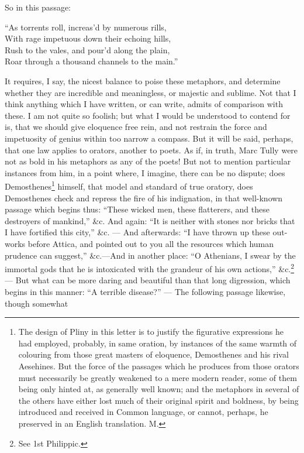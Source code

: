 So in this passage:

``As torrents roll, increas'd by numerous rills,\\
With rage impetuous down their echoing hills,\\
Rush to the vales, and pour'd along the plain,\\
Roar through a thousand channels to the main.''

It requires, I say, the nicest balance to poise these metaphors, and
determine whether they are incredible and meaningless, or majestic and
sublime. Not that I think anything which I have written, or can write,
admits of comparison with these. I am not quite so foolish; but what I
would be understood to contend for is, that we should give eloquence free
rein, and not restrain the force and impetuosity of genius within too
narrow a compass. But it will be said, perhaps, that one law applies to
orators, another to poets. As if, in truth, Marc Tully were not as bold in
his metaphors as any of the poets! But not to mention particular instances
from him, in a point where, I imagine, there can be no dispute; does
Demosthenes\footnote{The design of Pliny in
this letter is to justify the figurative expressions he had employed,
probably, in same oration, by instances of the same warmth of colouring
from those great masters of eloquence, Demosthenes and his rival
Aesehines. But the force of the passages which he produces from those
orators must necessarily be greatly weakened to a mere modern reader, some
of them being only hinted at, as generally well known; and the metaphors
in several of the others have either lost much of their original spirit
and boldness, by being introduced and received in Common language, or
cannot, perhaps, he preserved in an English translation. M.} himself, that model and standard of true
oratory, does Demosthenes check and repress the fire of his indignation,
in that well-known passage which begins thus: ``These wicked men, these
flatterers, and these destroyers of mankind,'' \&c. And again: ``It is
neither with stones nor bricks that I have fortified this city,'' \&c.
— And afterwards: ``I have thrown up these out-works before Attica,
and pointed out to you all the resources which human prudence can
suggest,'' \&c.—And in another place: ``O Athenians, I swear by the
immortal gods that he is intoxicated with the grandeur of his own
actions,'' \&c.\footnote{See 1st Philippic.} — But what can be more daring and
beautiful than that long digression, which begins in this manner: ``A
terrible disease?'' — The following passage likewise, though somewhat
